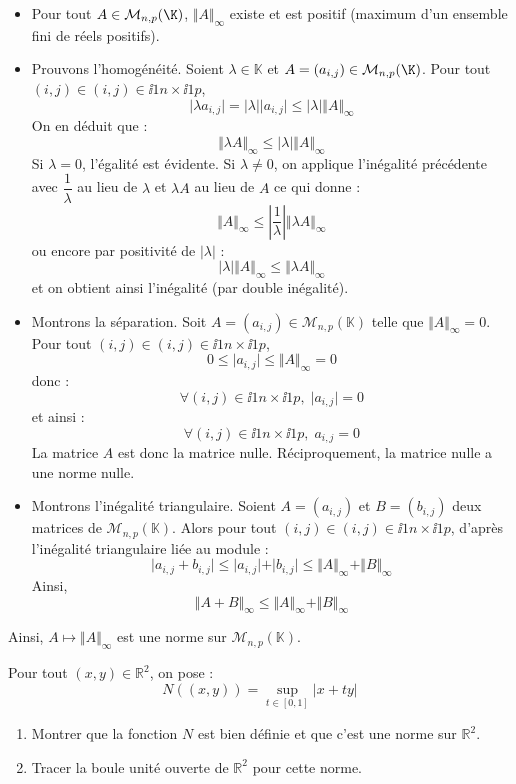 \documentclass[a4paper,twoside,french,11pt]{VcCours}
\begin{document}
\begin{itemize}
\item Pour tout $A \in \mathcal{M}_{n,p}(\K)$, $\Vert A \Vert_{\infty}$ existe et est positif (maximum d'un ensemble fini de réels positifs).
\item Prouvons l'homogénéité. Soient $\lambda \in \mathbb{K}$ et $A=(a_{i,j}) \in \mathcal{M}_{n,p}(\K)$. Pour tout $(i,j) \in (i,j) \in \ii{1}{n} \times \ii{1}{p}$,
$$ \vert \lambda a_{i,j} \vert = \vert \lambda \vert \vert a_{i,j}\vert \leq \vert \lambda \vert \Vert A \Vert_{\infty}$$
On en déduit que :
$$ \Vert \lambda A \Vert_{\infty} \leq \vert \lambda \vert \Vert A \Vert_{\infty}$$
Si $\lambda = 0$, l'égalité est évidente. Si $\lambda \neq 0$, on applique l'inégalité précédente avec $\dfrac{1}{\lambda}$ au lieu de $\lambda$ et $\lambda A$ au lieu de $A$ ce qui donne :
$$ \Vert  A \Vert_{\infty} \leq \left\vert \dfrac{1}{\lambda} \right\vert \Vert \lambda A \Vert_{\infty}$$
ou encore par positivité de $\vert \lambda \vert $ :
$$ \vert \lambda \vert \Vert A \Vert_{\infty} \leq \Vert \lambda A \Vert_{\infty}$$
et on obtient ainsi l'inégalité (par double inégalité).


\item Montrons la séparation. Soit $A=(a_{i,j}) \in \mathcal{M}_{n,p}(\mathbb{K})$ telle que $\Vert A \Vert_{\infty}=0$. Pour tout $(i,j) \in (i,j) \in \ii{1}{n} \times \ii{1}{p}$,
$$ 0 \leq \vert a_{i,j} \vert \leq \Vert A \Vert_{\infty}=0$$
donc :
$$ \forall (i,j) \in \ii{1}{n} \times \ii{1}{p}, \; \vert a_{i,j} \vert =0$$
et ainsi :
$$  \forall (i,j) \in \ii{1}{n} \times \ii{1}{p}, \;  a_{i,j}  =0$$
La matrice $A$ est donc la matrice nulle. Réciproquement, la matrice nulle a une norme nulle.
\item Montrons l'inégalité triangulaire. Soient $A=(a_{i,j})$ et $B=(b_{i,j})$ deux matrices de $\mathcal{M}_{n,p}(\mathbb{K})$. Alors pour tout $(i,j) \in (i,j) \in \ii{1}{n} \times \ii{1}{p}$, d'après l'inégalité triangulaire liée au module :
$$ \vert a_{i,j} + b_{i,j} \vert \leq \vert a_{i,j} \vert + \vert b_{i,j} \vert \leq \Vert A \Vert_{\infty} + \Vert B \Vert_{\infty}$$
Ainsi,
$$ \Vert A+B \Vert_{\infty}  \leq \Vert A \Vert_{\infty} + \Vert B \Vert_{\infty}$$
\end{itemize}
Ainsi, $A \mapsto \Vert A \Vert_{\infty}$ est une norme sur $\mathcal{M}_{n,p}(\mathbb{K})$.




\begin{Exercice}{} Pour tout $(x,y) \in \mathbb{R}^2$, on pose :
$$ N((x,y)) = \sup_{t \in [0,1]} \vert x+ty \vert$$

\begin{enumerate}
\item Montrer que la fonction $N$ est bien définie et que c'est une norme sur $\mathbb{R}^2$.
\item Tracer la boule unité ouverte de $\mathbb{R}^2$ pour cette norme.
\end{enumerate}
\end{Exercice}
\end{document}
